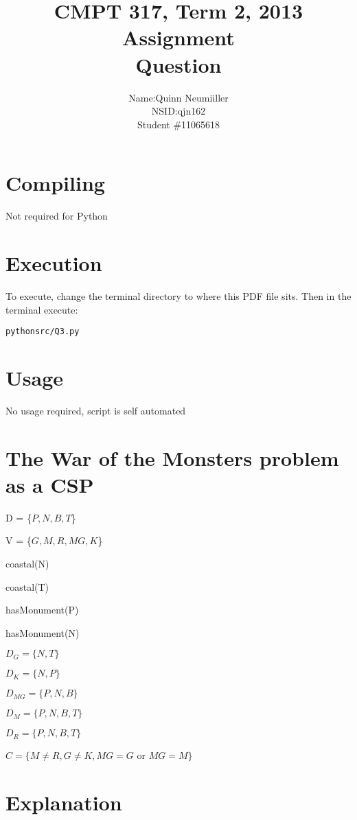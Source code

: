 \documentclass{article}
\title{CMPT 317, Term 2, 2013\\
Assignment \AssignmentNum\\
Question \QuestionNum\\
\AssignmentTitle
}
\author{
    \begin{tabular}{ l r }
      Name: & Quinn Neumiiller \\
      NSID: & qjn162 \\
      Student \# & 11065618 \\
    \end{tabular}
}
\date{\AssignmentDate}
\newcommand{\QuestionNum}{3}
\begin{document}
   \maketitle
   
   \section{Compiling}
   Not required for Python

   \section{Execution}
   To execute, change the terminal directory to where this PDF file sits.
   Then in the terminal execute:
    \begin{alltt}
    python src/Q\QuestionNum.py
    \end{alltt}

  \section{Usage}
    No usage required, script is self automated
  \section{The War of the Monsters problem as a CSP}
  {\setlength{\parindent}{0cm}
    D = \{$P, N, B, T$\}

    V = \{$G, M, R, MG, K$\}

    coastal(N)

    coastal(T)

    hasMonument(P)

    hasMonument(N)

    $D_G = \{N, T\}$

    $D_K = \{N, P\}$

    $D_{MG} = \{P, N, B\}$

    $D_M = \{P, N, B, T\}$

    $D_R = \{P, N, B, T\}$


    $C=\{M\ne R, G \ne K, MG=G$ or $MG=M\}$

  }


  \section{Explanation}
\end{document}
